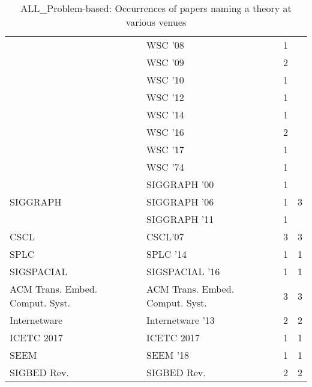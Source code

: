 \begin{table*}[t]
\begin{tabular}{llrr}
& WSC '08 & 1 &\\
& WSC '09 & 2 &\\
& WSC '10 & 1 &\\
& WSC '12 & 1 &\\
& WSC '14 & 1 &\\
& WSC '16 & 2 &\\
& WSC '17 & 1 &\\
& WSC '74 & 1 &\\
\multirow{3}{*}{SIGGRAPH } & SIGGRAPH '00 & 1 & \multirow{3}{*}{3}\\
& SIGGRAPH '06 & 1 &\\
& SIGGRAPH '11 & 1 &\\
\multirow{1}{*}{CSCL} & CSCL'07 & 3 & \multirow{1}{*}{3}\\
\multirow{1}{*}{SPLC } & SPLC '14 & 1 & \multirow{1}{*}{1}\\
\multirow{1}{*}{SIGSPACIAL } & SIGSPACIAL '16 & 1 & \multirow{1}{*}{1}\\
\multirow{1}{*}{ACM Trans. Embed. Comput. Syst.} & ACM Trans. Embed. Comput. Syst. & 3 & \multirow{1}{*}{3}\\
\multirow{1}{*}{Internetware } & Internetware '13 & 2 & \multirow{1}{*}{2}\\
\multirow{1}{*}{ICETC 2017} & ICETC 2017 & 1 & \multirow{1}{*}{1}\\
\multirow{1}{*}{SEEM } & SEEM '18 & 1 & \multirow{1}{*}{1}\\
\multirow{1}{*}{SIGBED Rev.} & SIGBED Rev. & 2 & \multirow{1}{*}{2}\\
\end{tabular}
\caption{ALL\_Problem-based: Occurrences of papers naming a theory at various venues}
\end{table*}